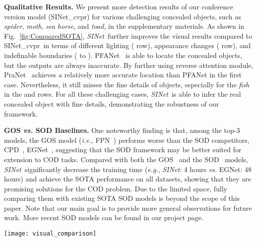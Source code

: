 \documentclass[10pt,journal,compsoc]{IEEEtran}
\def\ie{\emph{i.e.}}
\def\eg{\emph{e.g.}}
\newcommand{\myPara}[1]{\vspace{6pt}\noindent\textbf{#1}\qquad }
\newcommand{\figref}[1]{Fig.~\ref{#1}}
\newcommand{\supp}[1]{#1}
\def\ournewmodel{\emph{SINet}}
\begin{document}
\myPara{Qualitative Results.}
We present more detection results of our conference version model (SINet\_cvpr) 
for various challenging concealed objects, such as \emph{spider}, \emph{moth}, 
\emph{sea horse}, and \emph{toad}, in the \supp{supplementary materials}.
As shown in \figref{fig:ComparedSOTA}, \ournewmodel~further improves the visual 
results compared to SINet\_cvpr~in terms of different lighting ( row), 
appearance changes ( row), 
and indefinable boundaries ( to ).  
PFANet~\cite{zhao2019pyramid} is able to locate the concealed objects, 
but the outputs are always inaccurate.
By further using reverse attention module, PraNet~\cite{fan2020pranet} 
achieves a relatively more accurate location than PFANet in the first case. 
Nevertheless, it still misses the fine details of objects,
especially for the \emph{fish} in the  and  rows.
For all these challenging cases, \ournewmodel~is able to
infer the real concealed object with fine details, 
demonstrating the robustness of our framework.


\myPara{GOS \textit{vs.} SOD Baselines.}
One noteworthy finding is that, among the top-3 models, 
the GOS model (\ie, FPN~\cite{lin2017feature})
performs worse than the SOD competitors, CPD~\cite{wu2019cascaded}, 
EGNet~\cite{zhao2019EGNet},
suggesting that the SOD framework may be better suited for extension to COD tasks.
Compared with both the GOS~\cite{lin2017feature,he2017mask,zhao2017pyramid,
zou2018DLMIA,huang2019mask,chen2019hybrid} 
and the SOD~\cite{liu2018picanet,zhao2019pyramid,wu2019cascaded,zhao2019EGNet}
models, \ournewmodel~significantly decrease the training time
(\eg, \ournewmodel: 4 hours \textit{vs.} EGNet: 48 hours) and 
achieve the SOTA performance on all datasets, 
showing that they are promising solutions for the COD problem. 
Due to the limited space, fully comparing them with existing SOTA SOD models 
is beyond the scope of this paper. 
Note that our main goal is to provide more general observations for 
future work. 
More recent SOD models can be found in our project page.

\begin{figure*}[t!]
  \centering
  \texttt{[image: visual\_comparison]}
  \vspace*{-15pt}
  \caption{\textbf{Comparison of our \ournewmodel~and 
    three top-performing baselines}, 
    including (d) SINet\_cvpr~\cite{fan2020camouflaged}, 
    (e) PraNet~\cite{fan2020pranet}, and (f) PFANet~\cite{zhao2019pyramid}.
  }\label{fig:ComparedSOTA}
\end{figure*}
\end{document}
